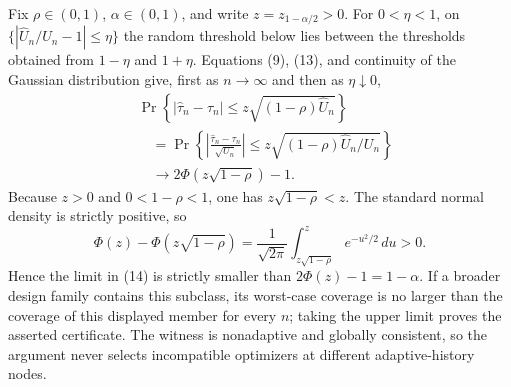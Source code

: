 Fix \(\rho\in(0,1)\), \(\alpha\in(0,1)\), and write \(z=z_{1-\alpha/2}>0\). For \(0<\eta<1\), on
\(\{|\widehat U_n/U_n-1|\le\eta\}\) the random threshold below lies between the thresholds obtained from \(1-\eta\) and \(1+\eta\). Equations (9), (13), and continuity of the Gaussian distribution give, first as \(n\to\infty\) and then as \(\eta\downarrow0\),
\[
\begin{aligned}
&\Pr\left\{|\widehat\tau_n-\tau_n|
\le z\sqrt{(1-\rho)\widehat U_n}\right\}\\
&\quad=\Pr\left\{
\left|\frac{\widehat\tau_n-\tau_n}{\sqrt{U_n}}\right|
\le z\sqrt{(1-\rho)\widehat U_n/U_n}\right\}\\
&\quad\longrightarrow2\Phi\left(z\sqrt{1-\rho}\right)-1.
\end{aligned}
\tag{14}
\]
Because \(z>0\) and \(0<1-\rho<1\), one has \(z\sqrt{1-\rho}<z\). The standard normal density is strictly positive, so
\[
\Phi(z)-\Phi(z\sqrt{1-\rho})
=\frac1{\sqrt{2\pi}}\int_{z\sqrt{1-\rho}}^z e^{-u^2/2}\,du>0.
\]
Hence the limit in (14) is strictly smaller than \(2\Phi(z)-1=1-\alpha\). If a broader design family contains this subclass, its worst-case coverage is no larger than the coverage of this displayed member for every \(n\); taking the upper limit proves the asserted certificate. The witness is nonadaptive and globally consistent, so the argument never selects incompatible optimizers at different adaptive-history nodes.